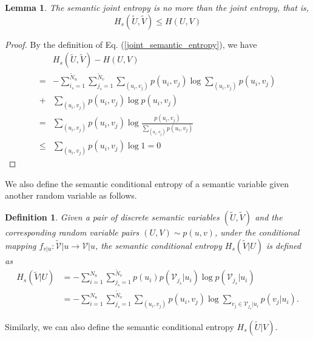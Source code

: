 \documentclass[12pt, draftclsnofoot,onecolumn]{IEEEtran}
\newtheorem{lemma}{\bf{Lemma}}
\newtheorem{definition}{\bf{Definition}}
\begin{document}
\begin{lemma}\label{lemma3}
The semantic joint entropy is no more than the joint entropy, that is,
\begin{equation}
H_s(\tilde{U},\tilde{V})\leq H(U,V)
\end{equation}
\end{lemma}
\begin{proof}
By the definition of Eq. (\ref{joint_semantic_entropy}), we have
\begin{equation}
\begin{aligned}
&H_s\left(\tilde{U},\tilde{V}\right)-H(U,V)\\
=&-\sum_{i_s=1}^{{\tilde{N}}_u}\sum_{j_s=1}^{{\tilde{N}}_v} \sum_{(u_i,v_j)} p\left(u_i,v_j\right) \log \sum_{(u_i,v_j)} p\left(u_i,v_j\right)\\
+&\sum_{(u_i,v_j)} p\left(u_i,v_j\right) \log p\left(u_i,v_j\right)\\
=&\sum_{(u_i,v_j)} p\left(u_i,v_j\right)\log \frac{p\left(u_i,v_j\right)}{\sum_{(u_i,v_j)} p\left(u_i,v_j\right)}\\
\leq & \sum_{(u_i,v_j)} p\left(u_i,v_j\right)\log 1 =0
\end{aligned}
\end{equation}
\end{proof}


We also define the semantic conditional entropy of a semantic variable given another random variable as follows.
\begin{definition}
Given a pair of discrete semantic variables $(\tilde {U},\tilde {V})$ and the corresponding random variable pairs $\left(U,V\right)\sim p(u,v)$, under the conditional mapping $f_{v|u}: \tilde {\mathcal{V}}|u \to \mathcal{V}|u$, the semantic conditional entropy $H_s(\tilde {V}|U)$ is defined as
\begin{equation}
\begin{aligned}
H_s(\tilde {V}| U)&=-\sum_{i=1}^{N_u}\sum_{j_s=1}^{{\tilde{N}}_v}p\left(u_i\right)p\left(\mathcal{V}_{j_s}\left|u_i\right.\right) \log p\left(\mathcal{V}_{j_s}\left|u_i\right.\right)  \\
&=-\sum_{i=1}^{N_u}\sum_{j_s=1}^{{\tilde{N}}_v} \sum_{(u_i,v_j)} p\left(u_i,v_j\right) \log \sum_{v_j\in \mathcal{V}_{j_s}|u_i} p\left(v_j\left|u_i\right.\right).
\end{aligned}
\end{equation}
\end{definition}
Similarly, we can also define the semantic conditional entropy $H_s(\tilde {U}|V )$.
\end{document}
